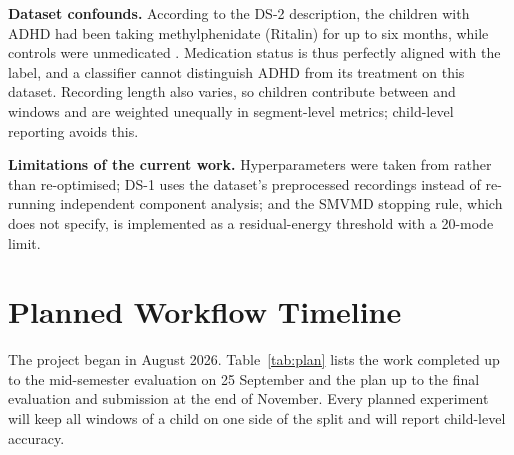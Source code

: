 \documentclass[11pt,a4paper]{article}
\begin{document}
\textbf{Dataset confounds.} According to the DS-2 description, the children
with ADHD had been taking methylphenidate (Ritalin) for up to six months,
while controls were unmedicated \cite{motie2020,chandela2025}. Medication
status is thus perfectly aligned with the label, and a classifier cannot
distinguish ADHD from its treatment on this dataset. Recording length also
varies, so children contribute between \nSegPerSubjMinAdhd{} and
\nSegPerSubjMaxAdhd{} windows and are weighted unequally in segment-level
metrics; child-level reporting avoids this.

\textbf{Limitations of the current work.} Hyperparameters were taken from
\cite{chandela2025} rather than re-optimised; DS-1 uses the dataset's
preprocessed recordings instead of re-running independent component analysis;
and the SMVMD stopping rule, which \cite{chandela2025} does not specify, is
implemented as a residual-energy threshold with a 20-mode limit.

\section{Planned Workflow Timeline}
\label{sec:plan}

The project began in August 2026. Table~\ref{tab:plan} lists the work
completed up to the mid-semester evaluation on 25 September and the plan up to
the final evaluation and submission at the end of November. Every planned
experiment will keep all windows of a child on one side of the split and will
report child-level accuracy.
\end{document}
